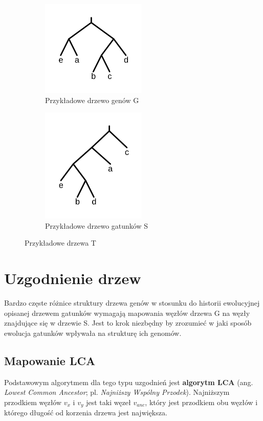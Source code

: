 \documentclass[licencjacka]{pracamgr}
\begin{document}
\begin{figure}[h]
\centering
\begin{subfigure}{.5\textwidth}
  \centering
  \includegraphics[width=50mm]{./pictures/gene.png}
  \caption{Przykładowe drzewo genów G}
  \label{fig:sub2}
\end{subfigure}%
\begin{subfigure}{.5\textwidth}
  \centering
  \includegraphics[width=50mm]{./pictures/species.png}
  \caption{Przykładowe drzewo gatunków S}
  \label{fig:sub1}
\end{subfigure}%
\caption{Przykładowe drzewa T \cite{gsevol}}
\label{fig:test}
\end{figure}

\section{Uzgodnienie drzew}
Bardzo częste różnice struktury drzewa genów w stosunku do historii ewolucyjnej opisanej drzewem gatunków wymagają mapowania węzłów drzewa G na węzły znajdujące się w drzewie S. Jest to krok niezbędny by zrozumieć w jaki sposób ewolucja gatunków wpływała na strukturę ich genomów. 

\subsection{Mapowanie LCA}
Podstawowym algorytmem dla tego typu uzgodnień jest \textbf{algorytm LCA} (ang. \textit{Lowest Common Ancestor}; pl. \textit{Najniższy Wspólny Przodek}). Najniższym przodkiem węzłów $v_x$ i $v_y$ jest taki węzeł $v_{anc}$, który jest przodkiem obu węzłów i którego długość od korzenia drzewa jest największa.
\end{document}
